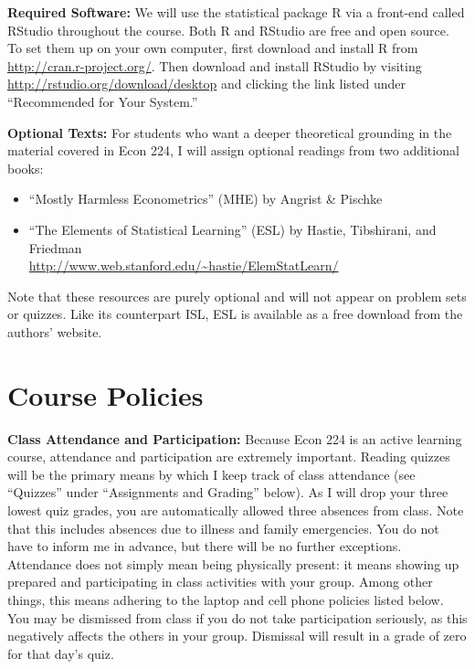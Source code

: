 \documentclass[11pt, letterpaper]{article}
\begin{document}
\noindent \textbf{Required Software:} 
We will use the statistical package R via a front-end called RStudio throughout the course. 
Both R and RStudio are free and open source. 
To set them up on your own computer, first download and install R from \url{http://cran.r-project.org/}. 
Then download and install RStudio by visiting \url{http://rstudio.org/download/desktop} and clicking the link listed under ``Recommended for Your System.'' 


\medskip

\noindent \textbf{Optional Texts:}
For students who want a deeper theoretical grounding in the material covered in Econ 224, I will assign optional readings from two additional books:
\begin{itemize}
  \item ``Mostly Harmless Econometrics'' (MHE) by Angrist \& Pischke
  \item ``The Elements of Statistical Learning'' (ESL) by Hastie, Tibshirani, and Friedman \\\url{http://www.web.stanford.edu/~hastie/ElemStatLearn/}
\end{itemize}
Note that these resources are purely optional and will not appear on problem sets or quizzes.
Like its counterpart ISL, ESL is available as a free download from the authors' website.


\section*{Course Policies}


\noindent \textbf{Class Attendance and Participation:}
Because Econ 224 is an active learning course, attendance and participation are extremely important. 
Reading quizzes will be the primary means by which I keep track of class attendance (see ``Quizzes'' under ``Assignments and Grading'' below).
As I will drop your three lowest quiz grades, you are automatically allowed three absences from class.
Note that this includes absences due to illness and family emergencies.
You do not have to inform me in advance, but there will be no further exceptions.
Attendance does not simply mean being physically present: it means showing up prepared and participating in class activities with your group.
Among other things, this means adhering to the laptop and cell phone policies listed below.
You may be dismissed from class if you do not take participation seriously, as this negatively affects the others in your group.
Dismissal will result in a grade of zero for that day's quiz.
\end{document}

